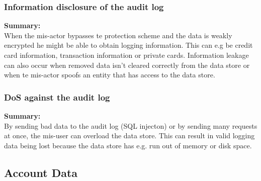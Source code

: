 \documentclass[a4paper,11pt]{report}
\begin{document}
\subsubsection{Information disclosure of the audit log}
\label{AuditLogCasesI}
\textbf{Summary:} \\
When the mis-actor bypasses te protection scheme and the data is weakly encrypted he might be able to obtain logging information. This can e.g be credit card information, transaction information or private cards. Information leakage can also occur when removed data isn't cleared correctly from the data store or when te mis-actor spoofs an entity that has access to the data store.

\subsubsection{DoS against the audit log}
\label{AuditLogCasesD}
\textbf{Summary:} \\
By sending bad data to the audit log (SQL injecton) or by sending many requests at once, the mis-user can overload the data store. This can result in valid logging data being lost because the data store has e.g. run out of memory or disk space.

\subsection{Account Data}
\label{AccountDataCases}
\end{document}
